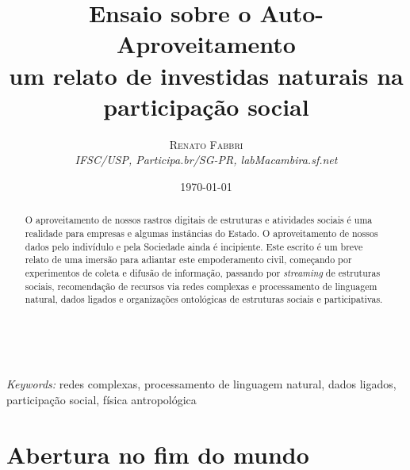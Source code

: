 \documentclass[a4paper, 11pt]{article} %
\title{\textbf{Ensaio sobre o Auto-Aproveitamento}\\ %
um relato de investidas naturais na participação social} %
\author{\textsc{Renato Fabbri} %
\\{\textit{IFSC/USP, Participa.br/SG-PR, labMacambira.sf.net}}} %
\date{\today} %
\makeatletter
\renewcommand{\maketitle}{ %
\begin{flushright} %
{\LARGE\@title} %

\vspace{50pt} %

{\large\@author} %
\\\@date %

\vspace{40pt} %
\end{flushright}
}
\makeatother
\begin{document}
\maketitle %



\begin{abstract}
O aproveitamento de nossos rastros digitais de estruturas e atividades sociais é uma realidade para empresas e algumas instâncias do Estado. O aproveitamento de nossos dados pelo indivídulo e pela Sociedade ainda é incipiente. Este escrito é um breve relato de uma imersão para adiantar este empoderamento civil, começando por experimentos de coleta e difusão de informação, passando por \emph{streaming} de estruturas sociais, recomendação de recursos via redes complexas e processamento de linguagem natural, dados ligados e organizações ontológicas de estruturas sociais e participativas.
\end{abstract}

\hspace*{3,6mm}\textit{Keywords:} redes complexas, processamento de linguagem natural, dados ligados, participação social, física antropológica %


\tableofcontents


\section*{Abertura no fim do mundo}
\end{document}
